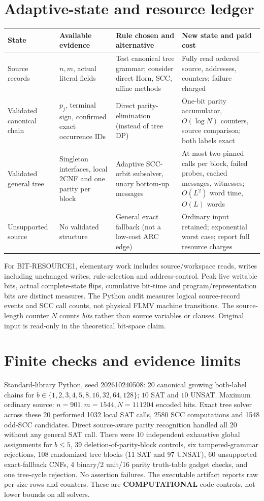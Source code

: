 \documentclass[11pt]{article}
\begin{document}
\section{Adaptive-state and resource ledger}
\begin{center}\begin{tabular}{p{.16\linewidth}p{.21\linewidth}p{.22\linewidth}p{.28\linewidth}}\toprule
State & Available evidence & Rule chosen and alternative & New state and paid cost\\\midrule
Source records & $n,m$, actual literal fields & Test canonical tree grammar; consider direct Horn, SCC, affine methods & Fully read ordered source, addresses, counters; failure charged\\
Validated canonical chain & $p_j$, terminal sign, confirmed exact occurrence IDs & Direct parity-elimination (instead of tree DP) & One-bit parity accumulator, $O(\log N)$ counters, source comparison; both labels exact\\
Validated general tree & Singleton interfaces, local 2CNF and one parity per block & Adaptive SCC-orbit subsolver, unary bottom-up messages & At most two pinned calls per block, failed probes, cached messages, witnesses; $O(L^2)$ word time, $O(L)$ words\\
Unsupported source & No validated structure & General exact fallback (not a low-cost ARC edge) & Ordinary input retained; exponential worst case; report full resource charges\\\bottomrule\end{tabular}\end{center}
For BIT-RESOURCE1, elementary work includes source/workspace reads, writes including unchanged writes, rule-selection and address-control. Peak live writable bits, actual complete-state flips, cumulative bit-time and program/representation bits are distinct measures. The Python audit measures logical source-record events and SCC call counts, not physical FLMV machine transitions. The source-length counter $N$ counts \emph{bits} rather than source variables or clauses. Original input is read-only in the theoretical bit-space claim.

\section{Finite checks and evidence limits}
Standard-library Python, seed 202610240508: 20 canonical growing both-label chains for $b\in\{1,2,3,4,5,8,16,32,64,128\}$; $10$ SAT and $10$ UNSAT. Maximum ordinary source: $n=901,m=1544,N=111204$ encoded bits. Exact tree solver across these 20 performed 1032 local SAT calls, 2580 SCC computations and 1548 odd-SCC candidates. Direct source-aware parity recognition handled all 20 without any general SAT call. There were 10 independent exhaustive global assignments for $b\le5$, 39 deletion-of-parity-block controls, six tampered-grammar rejections, 108 randomized tree blocks (11 SAT and 97 UNSAT), 60 unsupported exact-fallback CNFs, 4 binary/2 unit/16 parity truth-table gadget checks, and one tree-cycle rejection. No assertion failures. The executable artifact reports raw per-size rows and counters. These are \textbf{COMPUTATIONAL} code controls, not lower bounds on all solvers.
\end{document}
